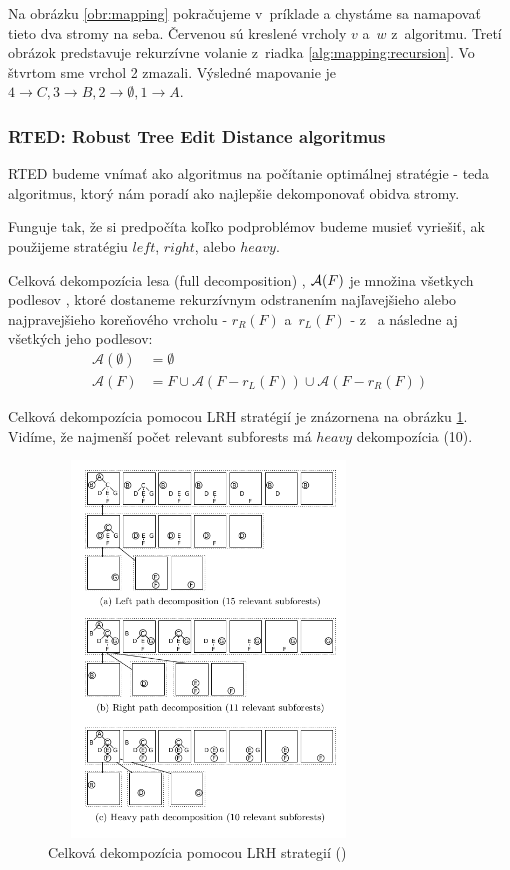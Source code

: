 Na obrázku \ref{obr:mapping} pokračujeme v~príklade a chystáme sa namapovať tieto
dva stromy na seba. Červenou sú kreslené vrcholy $v$ a~$w$ z~algoritmu.
Tretí obrázok predstavuje rekurzívne volanie z~riadka \ref{alg:mapping:recursion}.
Vo štvrtom sme vrchol 2 zmazali.
Výsledné mapovanie je $4 \to C, 3 \to B, 2 \to \emptyset, 1 \to A$.





\subsubsection{RTED: Robust Tree Edit Distance algoritmus}

RTED budeme vnímať ako algoritmus na počítanie optimálnej stratégie - teda algoritmus,
ktorý nám poradí ako najlepšie dekomponovať obidva stromy.

Funguje tak, že si predpočíta koľko podproblémov budeme musieť vyriešiť, ak použijeme stratégiu
$left$, $right$, alebo $heavy$.

\begin{definice}
  Celková dekompozícia lesa (full decomposition) , $\mathcal{A}(F)$ je množina
  všetkych podlesov , ktoré dostaneme rekurzívnym odstranením najľavejšieho
  alebo najpravejšieho koreňového vrcholu - $r_{R}(F)$ a~$r_{L}(F)$ - z~
	a následne aj všetkých jeho podlesov:
	\begin{align*}
		\mathcal{A}(\emptyset) &= \emptyset
		\\
		\mathcal{A}(F) &= {F} \cup \mathcal{A}(F - r_{L}(F)) \cup \mathcal{A}(F - r_{R}(F))
	\end{align*}
\end{definice}

Celková dekompozícia pomocou LRH stratégií je znázornena na obrázku \ref{obr:LRH_decomposition}.
Vidíme, že najmenší počet relevant subforests má $heavy$ dekompozícia (10).

\begin{figure}
\centering
\includegraphics[width=85mm, height=100mm]{../img/LRH_decomposition.png}
\caption{Celková dekompozícia pomocou LRH strategií (\citet{RTED})}
\label{obr:LRH_decomposition}
\end{figure}

